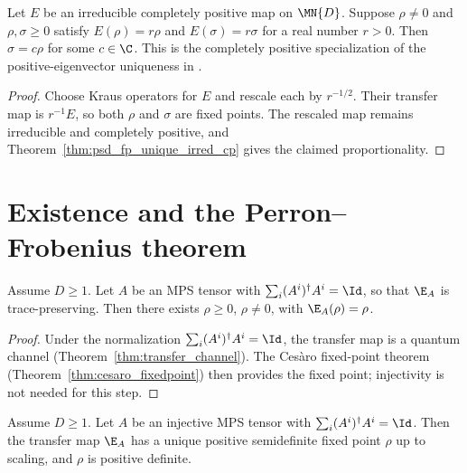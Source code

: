 \begin{theorem}
    \label{thm:psd_eigenvector_unique_irred}
    \leanok
    Let $E$ be an irreducible completely positive map on $\MN{D}$. Suppose
    $\rho\neq0$ and $\rho,\sigma\geq0$ satisfy
    $E(\rho)=r\rho$ and $E(\sigma)=r\sigma$ for a real number $r>0$.
    Then $\sigma=c\rho$ for some $c\in\C$.
    This is the completely positive specialization of the
    positive-eigenvector uniqueness in
    \cite[Theorem~6.3(2--3)]{Wolf2012Quantum}.
\end{theorem}

\begin{proof}\leanok
    Choose Kraus operators for $E$ and rescale each by $r^{-1/2}$. Their
    transfer map is $r^{-1}E$, so both $\rho$ and $\sigma$ are fixed points.
    The rescaled map remains irreducible and completely positive, and
    Theorem~\ref{thm:psd_fp_unique_irred_cp} gives the claimed
    proportionality.
\end{proof}

\section{Existence and the Perron--Frobenius theorem}

\begin{theorem}\label{thm:psd_fp_exists}
    \leanok
    Assume $D \ge 1$. Let $A$ be an MPS tensor with
    $\sum_i (A^i)^\dagger A^i = \Id$, so that $\E_A$ is
    trace-preserving.
    Then there exists $\rho \ge 0$, $\rho \neq 0$,
    with $\E_A(\rho) = \rho$.
\end{theorem}

\begin{proof}
    \leanok
    Under the normalization $\sum_i (A^i)^\dagger A^i = \Id$,
    the transfer map is a quantum channel
    (Theorem~\ref{thm:transfer_channel}).
    The Ces\`aro fixed-point theorem
    (Theorem~\ref{thm:cesaro_fixedpoint}) then provides the
    fixed point; injectivity is not needed for this step.
\end{proof}

\begin{theorem}\label{thm:qpf}
    \leanok
    Assume $D \ge 1$. Let $A$ be an injective MPS tensor with
    $\sum_i (A^i)^\dagger A^i = \Id$.
    Then the transfer map $\E_A$ has a unique positive semidefinite fixed point
    $\rho$ up to scaling, and $\rho$ is positive definite.
\end{theorem}

